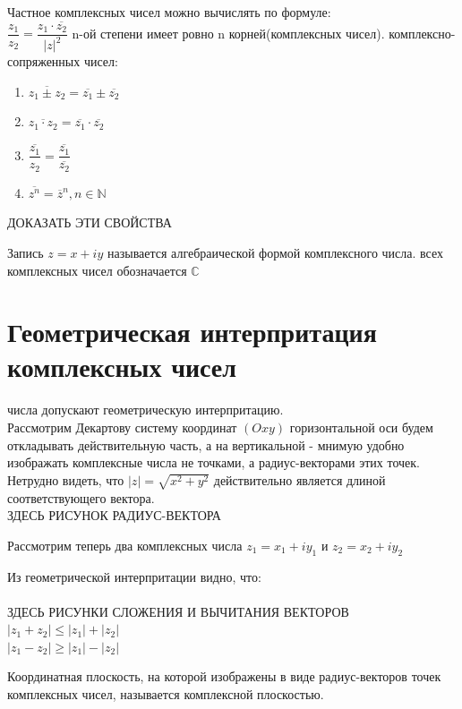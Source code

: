\documentclass[oneside]{book}
\begin{document}
\begin{enumerate}
\begin{itemize}
\begin{enumerate}
\par Частное комплексных чисел можно вычислять по формуле:\\
$\dfrac{z_1}{z_2}=\dfrac{z_1\cdot \overline{z_2}}{|z|^2}$
 n-ой степени имеет ровно n корней(комплексных чисел).
 комплексно-сопряженных чисел:\\
\begin{enumerate}
	\item $\overline{z_1\pm z_2}=\overline{z_1}\pm \overline{z_2}$
	\item $\overline{z_1\cdot z_2}=\overline{z_1}\cdot \overline{z_2}$
	\item $\overline{\dfrac{z_1}{z_2}}=\dfrac{\overline{z_1}}{\overline{z_2}}$
	\item $\overline{z^n}=\overline{z}^n, n \in \mathbb{N}$
\end{enumerate}
ДОКАЗАТЬ ЭТИ СВОЙСТВА\\
\par Запись $z=x+iy$ называется алгебраической формой комплексного числа.
 всех комплексных чисел обозначается $\mathbb{C}$
\section{Геометрическая интерпритация комплексных чисел}
 числа допускают геометрическую интерпритацию.\\
Рассмотрим Декартову систему координат $(Oxy)$
 горизонтальной оси будем откладывать действительную часть, а на вертикальной - мнимую
 удобно изображать комплексные числа не точками, а радиус-векторами этих точек. Нетрудно видеть, что $|z|=\sqrt{x^2+y^2}$ действительно является длиной соответствующего вектора.
\\ЗДЕСЬ РИСУНОК РАДИУС-ВЕКТОРА\\
\par Рассмотрим теперь два комплексных числа $z_1=x_1+iy_1$ и $z_2=x_2+iy_2$
\par Из геометрической интерпритации видно, что:\\
\\ЗДЕСЬ РИСУНКИ СЛОЖЕНИЯ И ВЫЧИТАНИЯ ВЕКТОРОВ\\
$|z_1+z_2|\leq |z_1|+|z_2|$\\
$|z_1-z_2|\geq |z_1| - |z_2|$
\par Координатная плоскость, на которой изображены в виде радиус-векторов точек комплексных чисел, называется комплексной плоскостью.

\end{enumerate}
\end{itemize}
\end{enumerate}
\end{document}
